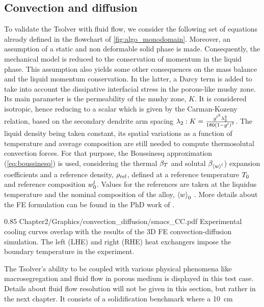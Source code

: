 \subsection{Convection and diffusion}
To validate the Tsolver with fluid flow, we consider the following set of equations
already defined in the flowchart of \cref{fig:algo_monodomain}. Moreover, an assumption 
of a static and non deformable solid phase is made. Consequently, the mechanical model is 
reduced to the conservation of momentum in the liquid phase. This assumption also yields 
some other consequences on the mass balance and the liquid momentum conservation. In the 
latter, a Darcy term is added to take into account the dissipative interfacial stress in 
the porous-like mushy zone. Its main parameter is the permeability of the mushy zone, $K$. 
It is considered isotropic, hence reducing to a scalar which is given by the Carman-Kozeny 
relation, based on the secondary dendrite arm spacing $\lambda_2: K= \frac{g^{l^3}  \lambda_2^{2}
 }{180\left( 1-g^l \right)^2}$. The liquid density being taken constant, its spatial variations 
as a function of temperature and average composition are still needed to compute thermosolutal 
convection forces. For that purpose, the Boussinesq approximation (\cref{eq:boussinesq}) is used, 
considering the thermal $\beta_T$ and solutal $\beta_{\left \langle w \right \rangle^l}$) expansion coefficients 
and a reference density, $\rho_{\text{ref}}$, defined at a reference temperature $T_{0}$ and reference 
composition $w_{0}^l$. Values for the references are taken at the liquidus temperature and the nominal 
composition of the alloy, $\left \langle w \right \rangle_0$ \citep{carozzani_direct_2013}. More details about the FE formulation can be found in 
the PhD work of \citet{rivaux_simulation_2011, carozzani_developpement_2012}.
%
\begin{figureth}
{0.85}
{Chapter2/Graphics/convection_diffusion/smacs_CC.pdf}
{Experimental cooling curves overlap with the results of the 3D FE convection-diffusion simulation.
The left (LHE) and right (RHE) heat exchangers impose the boundary temperature in the experiment.}
\label{fig:validation_convectiondiffusion}
\end{figureth}
%
The Tsolver’s ability to be coupled with various physical phenomena like macrosegregation and fluid flow 
in porous medium is displayed in this test case. Details about fluid flow resolution will not be given 
in this section, but rather in the next chapter. It consists of a solidification benchmark where a \SI{10}{\centi \metre}
